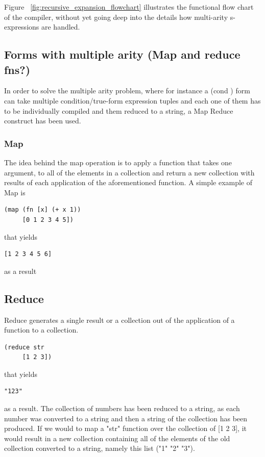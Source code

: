 Figure ~\ref{fig:recursive_expansion_flowchart} illustrates the functional flow chart of the compiler, without yet going deep into the details how multi-arity s-expressions are handled. 

\subsection{Forms with multiple arity (Map and reduce fns?)}

In order to solve the multiple arity problem, where for instance a (cond ) form can take multiple condition/true-form expression tuples and each one of them has to be individually compiled and them reduced to a string, a Map Reduce construct has been used. 

\subsubsection{Map}
The idea behind the map operation is to apply a function that takes one argument, to all of the elements in a collection and return a new collection with results of each application of the aforementioned function. 
A simple example of Map is 

\begin{verbatim}
(map (fn [x] (+ x 1)) 
	 [0 1 2 3 4 5])
\end{verbatim}
that yields 
\begin{verbatim}
[1 2 3 4 5 6]
\end{verbatim}
as a result

\subsection{Reduce}
Reduce generates a single result or a collection out of the application of a function to a collection.	

\begin{verbatim}
(reduce str 
	 [1 2 3])
\end{verbatim}
that yields 
\begin{verbatim}
"123"
\end{verbatim}
as a result. The collection of numbers has been reduced to a string, as each number was converted to a string and then a string of the collection has been produced.
If we would to map a "str" function over the collection of [1 2 3], it would result in a new collection containing all of the elements of the old collection converted to a string, namely this list ("1" "2" "3").


